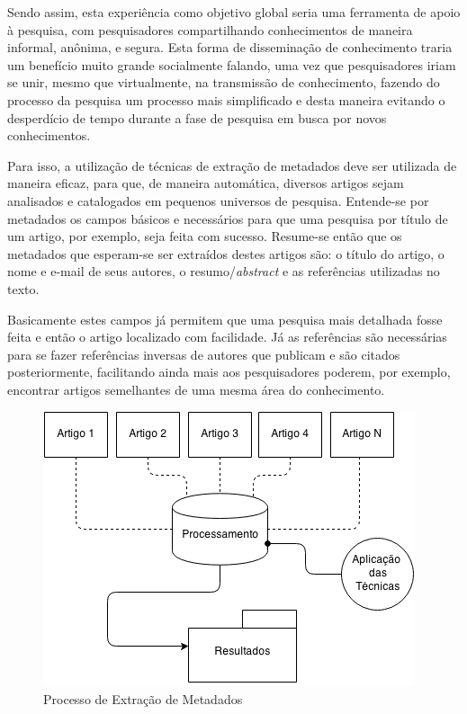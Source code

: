 \begin{textedited}
Sendo assim, esta experiência como objetivo global seria uma ferramenta de apoio à pesquisa, com pesquisadores compartilhando conhecimentos de maneira informal, anônima, e segura. Esta forma de disseminação de conhecimento traria um benefício muito grande socialmente falando, uma vez que pesquisadores iriam se unir, mesmo que virtualmente, na transmissão de conhecimento, fazendo do processo da pesquisa um processo mais simplificado e desta maneira evitando o desperdício de tempo durante a fase de pesquisa em busca por novos conhecimentos.
\end{textedited}

Para isso, a utilização de técnicas de extração de metadados deve ser utilizada de maneira eficaz, para que, de maneira automática, diversos artigos sejam analisados e catalogados em pequenos universos de pesquisa. Entende-se por metadados os campos básicos e necessários para que uma pesquisa por título de um artigo, por exemplo, seja feita com sucesso. Resume-se então que os metadados que esperam-se ser extraídos destes artigos são: o título do artigo, o nome e e-mail de seus autores, o resumo/\textit{abstract} e as referências utilizadas no texto.

\begin{textedited}
Basicamente estes campos já permitem que uma pesquisa mais detalhada fosse feita e então o artigo localizado com facilidade. Já as referências são necessárias para se fazer referências inversas de autores que publicam e são citados posteriormente, facilitando ainda mais aos pesquisadores poderem, por exemplo, encontrar artigos semelhantes de uma mesma área do conhecimento.
\end{textedited}

\begin{figure}
	\centering
	\caption{Processo de Extração de Metadados}
	\label{fig:introduction}
	\includegraphics[width=0.7\linewidth]{./assets/images/introduction}
\end{figure}

